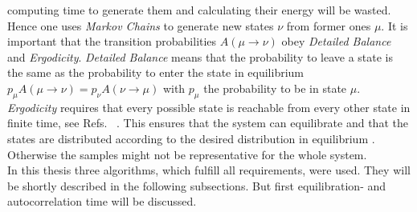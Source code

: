     computing time to generate them and calculating their energy will
    be wasted.
    Hence one uses \emph{Markov Chains} to generate new states \(\nu\)
    from former ones \(\mu\). It is important that the transition probabilities
    \(A(\mu \to \nu)\) obey \emph{Detailed Balance} and \emph{Ergodicity}.
    \emph{Detailed Balance} means that the probability to leave a state is
    the same as the probability to enter the state in equilibrium
    \(p_\mu A(\mu \to \nu) = p_\nu A(\nu \to \mu)\) with \(p_\mu\) the
    probability to be in state \(\mu\).
    \emph{Ergodicity} requires that every possible state is reachable
    from every other state in finite time, see Refs.\ \cite{NewmanBarkema1999} \cite{Katzgraber2011}.
    This ensures that the system can equilibrate and that the states are
    distributed according to the desired distribution in equilibrium
    \cite{NewmanBarkema1999}. Otherwise the samples might not be representative
    for the whole system.\\
    In this thesis three algorithms, which fulfill all requirements,
    were used. They will be shortly described in the following subsections.
    But first equilibration- and autocorrelation time will be discussed.

